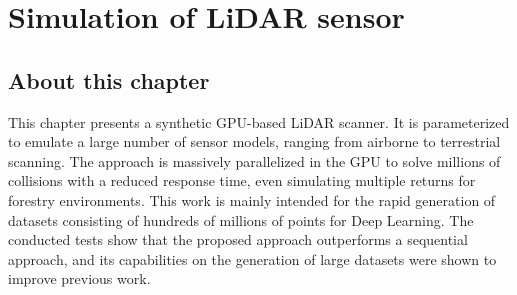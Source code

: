 \setchapterpreamble[u]{\margintoc}
\chapter{Simulation of LiDAR sensor}
\label{sec:lidar_simulation}

\section*{About this chapter}

This chapter presents a synthetic GPU-based LiDAR scanner. It is parameterized to emulate a large number of sensor models, ranging from airborne to terrestrial scanning. The approach is massively parallelized in the GPU to solve millions of collisions with a reduced response time, even simulating multiple returns for forestry environments. This work is mainly intended for the rapid generation of datasets consisting of hundreds of millions of points for Deep Learning. The conducted tests show that the proposed approach outperforms a sequential approach, and its capabilities on the generation of large datasets were shown to improve previous work. 

